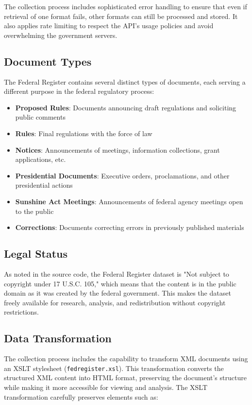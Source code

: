 The collection process includes sophisticated error handling to ensure that even if retrieval of one format fails, other formats can still be processed and stored. It also applies rate limiting to respect the API's usage policies and avoid overwhelming the government servers.

\subsection{Document Types}

The Federal Register contains several distinct types of documents, each serving a different purpose in the federal regulatory process:

\begin{itemize}
  \item \textbf{Proposed Rules}: Documents announcing draft regulations and soliciting public comments
  \item \textbf{Rules}: Final regulations with the force of law
  \item \textbf{Notices}: Announcements of meetings, information collections, grant applications, etc.
  \item \textbf{Presidential Documents}: Executive orders, proclamations, and other presidential actions
  \item \textbf{Sunshine Act Meetings}: Announcements of federal agency meetings open to the public
  \item \textbf{Corrections}: Documents correcting errors in previously published materials
\end{itemize}

\subsection{Legal Status}

As noted in the source code, the Federal Register dataset is "Not subject to copyright under 17 U.S.C. 105," which means that the content is in the public domain as it was created by the federal government. This makes the dataset freely available for research, analysis, and redistribution without copyright restrictions.

\subsection{Data Transformation}

The collection process includes the capability to transform XML documents using an XSLT stylesheet (\texttt{fedregister.xsl}). This transformation converts the structured XML content into HTML format, preserving the document's structure while making it more accessible for viewing and analysis. The XSLT transformation carefully preserves elements such as:

